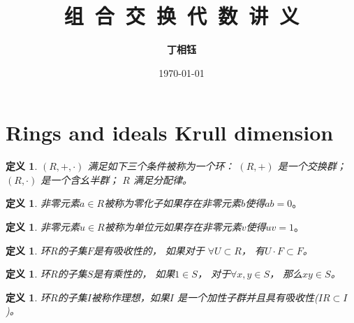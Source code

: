 \documentclass[12pt,a4paper]{ctexbook} %
\title{{\kaishu\fontsize{48}{60}\selectfont 组~合~交~换~代~数~讲~义}} %
\author{\bf 丁相钰}
\date{\today}
\newcounter{theorem}[section]
\newtheorem{definition}[theorem]{定义}
\numberwithin{figure}{section}
\theoremstyle{problemstyle}
\numberwithin{equation}{section} %
\begin{document}
\maketitle

\section{Rings and ideals \textrightarrow{} Krull dimension}
	\begin{definition}
		$(R,+,\cdot)$ 满足如下三个条件被称为一个环： $ (R,+) $ 是一个交换群； $ (R,\cdot) $ 是一个含幺半群； $ R $ 满足分配律。
	\end{definition}
 	\begin{definition}
		非零元素$ a \in R$被称为零化子如果存在非零元素$ b $使得$ ab=0。 $
	\end{definition}
    \begin{definition}
    	非零元素$ u \in R$被称为单位元如果存在非零元素$ v $使得$ uv=1。 $
    \end{definition}
    \begin{definition}
    环$ R $的子集$ F $是有吸收性的， 如果对于 $ \forall U\subset R$， 有$ U\cdot F\subset F $。
    \end{definition}
    \begin{definition}
    	环$ R $的子集$ S $是有乘性的， 如果$ 1\in S $， 对于$ \forall x,y\in S$， 那么$ xy\in S$。
    \end{definition} 
    \begin{definition}
    	环$ R $的子集$ I $被称作理想，如果$ I $ 是一个加性子群并且具有吸收性($ IR\subset I $)。
    \end{definition}
    
\end{document}
